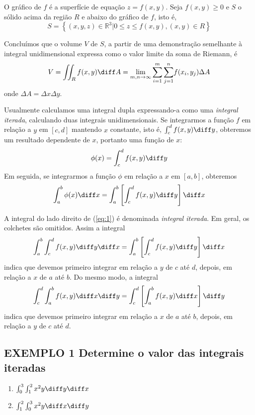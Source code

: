 \documentclass[a4paper, 12pt]{extreport}
\begin{document}
    O gráfico de $f$ é a superfície de equação $z = f(x,y)$. Seja $f(x,y) \geqslant 0$ e $S$ o sólido acima da região $R$ e abaixo do gráfico de $f$, isto é,
    $$ S = \left\{(x,y,z) \in \mathbb{R}^3 | 0 \leqslant z \leqslant f(x,y), (x,y) \in R \right\} $$

    Concluímos que o volume $V$ de $S$, a partir de uma demonstração semelhante à integral unidimensional expressa como o valor limite da soma de Riemann, é
    $$ V = \iint_R{f(x,y)\diff A} = \lim_{m,n \to \infty}{\sum_{i=1}^m{\sum_{j=1}^n}{f(x_i,y_j)\Delta A}} $$
    onde $\Delta A = \Delta x\Delta y$.

    Usualmente calculamos uma integral dupla expressando-a como uma \textsl{integral iterada}, calculando duas integrais unidimensionais.
    Se integrarmos a função $f$ em relação a $y$ em $[c,d]$ mantendo $x$ constante, isto é, $\int_c^d{f(x,y)\diff y}$, obteremos um resultado dependente de $x$,
    portanto uma função de $x$:
    $$ \phi (x) = \int_c^d{f(x,y)\diff y} $$
    Em seguida, se integrarmos a função $\phi$ em relação a $x$ em $[a,b]$, obteremos
    \begin{equation} \label{eq:1}
      \int_a^b{\phi (x)\diff x} = \int_a^b{\left[\int_c^d{f(x,y)\diff y}\right]\diff x}
    \end{equation}

    A integral do lado direito de (\ref{eq:1}) é denominada \textsl{integral iterada}. Em geral, os colchetes são omitidos. Assim a integral
    \begin{equation}
      \int_a^b{\int_c^d{f(x,y)\diff y}\diff x} = \int_a^b{\left[\int_c^d{f(x,y)\diff y}\right]\diff x}
    \end{equation}
    indica que devemos primeiro integrar em relação a $y$ de $c$ até $d$, depois, em relação a $x$ de $a$ até $b$. Do mesmo modo, a integral
    \begin{equation}
      \int_c^d{\int_a^b{f(x,y)\diff x}\diff y} = \int_c^d{\left[\int_a^b{f(x,y)\diff x}\right]\diff y}
    \end{equation}
    indica que devemos primeiro integrar em relação a $x$ de $a$ até $b$, depois, em relação a $y$ de $c$ até $d$.

    \newpage

    \subsection*{\small {\color{astral}EXEMPLO 1} \textmd{Determine o valor das integrais iteradas}}
      \begin{multicols}{2}
        \begin{enumerate}
          \renewcommand{\theenumi}{(\alph{enumi})}
          \item $\int_0^3{\int_1^2{x^2y}\diff y}\diff x$
          \item $\int_1^2{\int_0^3{x^2y}\diff x}\diff y$
        \end{enumerate}
      \end{multicols}
\end{document}
